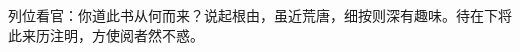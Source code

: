\documentclass{article}
\begin{document}
\begin{CJK}{UTF8}{gkai}

 \begin{pinyinscope}
列位看官：你道此书从何而来？说起根由，虽近荒唐，细按则深有趣味。待在下将此来历注明，方使阅者然不惑。
\end{pinyinscope}

\end{CJK}
\end{document}

